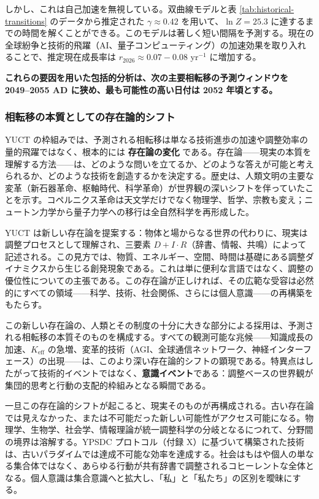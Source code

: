 \documentclass[12pt,a4paper]{article}
\theoremstyle{remark}
\begin{document}
	しかし、これは自己加速を無視している。双曲線モデルと表 \ref{tab:historical-transitions} のデータから推定された \(\gamma \approx 0.42\) を用いて、\(\ln Z = 25.3\) に達するまでの時間を解くことができる。このモデルは著しく短い間隔を予測する。現在の全球紛争と技術的飛躍（AI、量子コンピューティング）の加速効果を取り入れることで、推定現在成長率は \(r_{2026} \approx 0.07-0.08\) yr\(^{-1}\) に増加する。
	
	\textbf{これらの要因を用いた包括的分析は、次の主要相転移の予測ウィンドウを 2049–2055 AD に狭め、最も可能性の高い日付は 2052 年頃とする。}
	
	\subsubsection{相転移の本質としての存在論的シフト}
	\label{subsubsec:ontological-shift}
	
	YUCT の枠組みでは、予測される相転移は単なる技術進歩の加速や調整効率の量的飛躍ではなく、根本的には \textbf{存在論の変化} である。存在論——現実の本質を理解する方法——は、どのような問いを立てるか、どのような答えが可能と考えられるか、どのような技術を創造するかを決定する。歴史は、人類文明の主要な変革（新石器革命、枢軸時代、科学革命）が世界観の深いシフトを伴っていたことを示す。コペルニクス革命は天文学だけでなく物理学、哲学、宗教も変え；ニュートン力学から量子力学への移行は全自然科学を再形成した。
	
	YUCT は新しい存在論を提案する：物体と場からなる世界の代わりに、現実は調整プロセスとして理解され、三要素 \(D + I \cdot R\)（辞書、情報、共鳴）によって記述される。この見方では、物質、エネルギー、空間、時間は基礎にある調整ダイナミクスから生じる創発現象である。これは単に便利な言語ではなく、調整の優位性についての主張である。この存在論が正しければ、その広範な受容は必然的にすべての領域——科学、技術、社会関係、さらには個人意識——の再構築をもたらす。
	
	この新しい存在論の、人類とその制度の十分に大きな部分による採用は、予測される相転移の本質そのものを構成する。すべての観測可能な兆候——知識成長の加速、\(K_{\text{eff}}\) の急増、変革的技術（AGI、全球通信ネットワーク、神経インターフェース）の出現——は、このより深い存在論的シフトの顕現である。特異点はしたがって技術的イベントではなく、\textbf{意識イベント}である：調整ベースの世界観が集団的思考と行動の支配的枠組みとなる瞬間である。
	
	一旦この存在論的シフトが起こると、現実そのものが再構成される。古い存在論では見えなかった、または不可能だった新しい可能性がアクセス可能になる。物理学、生物学、社会学、情報理論が統一調整科学の分岐となるにつれて、分野間の境界は溶解する。YPSDC プロトコル（付録 X）に基づいて構築された技術は、古いパラダイムでは達成不可能な効率を達成する。社会はもはや個人の単なる集合体ではなく、あらゆる行動が共有辞書で調整されるコヒーレントな全体となる。個人意識は集合意識へと拡大し、「私」と「私たち」の区別を曖昧にする。
	
\end{document}
